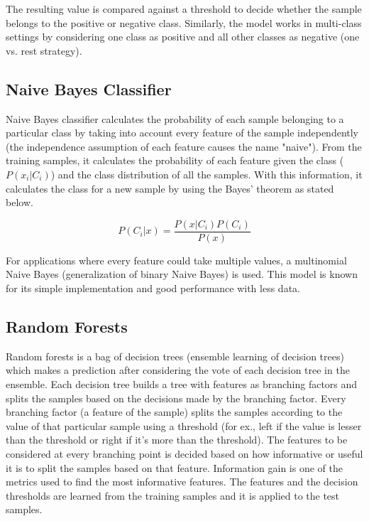     The resulting value is compared against a threshold to decide whether the sample belongs to the positive or negative class. Similarly, the model works in multi-class settings by considering one class as positive and all other classes as negative (one vs. rest strategy). 
    
     
    \subsection{Naive Bayes Classifier}
    
    Naive Bayes classifier calculates the probability of each sample belonging to a particular class by taking into account every feature of the sample independently (the independence assumption of each feature causes the name "naive"). From the training samples, it calculates the probability of each feature given the class ($P(x_i|C_i)$) and the class distribution of all the samples. With this information, it calculates the class for a new sample by using the Bayes' theorem as stated below.
    
    \begin{equation}
    P(C_i | x) = \frac{P(x|C_i) P(C_i)}{P(x)}
    \end{equation}  
    
    For applications where every feature could take multiple values, a multinomial Naive Bayes (generalization of binary Naive Bayes) is used. This model is known for its simple implementation and good performance with less data. 
    
    \subsection{Random Forests}
    
    Random forests is a bag of decision trees (ensemble learning of decision trees) which makes a prediction after considering the vote of each decision tree in the ensemble. Each decision tree builds a tree with features as branching factors and splits the samples based on the decisions made by the branching factor. Every branching factor (a feature of the sample) splits the samples according to the value of that particular sample using a threshold (for ex., left if the value is lesser than the threshold or right if it's more than the threshold). The features to be considered at every branching point is decided based on how informative or useful it is to split the samples based on that feature. Information gain is one of the metrics used to find the most informative features. The features and the decision thresholds are learned from the training samples and it is applied to the test samples.
    
